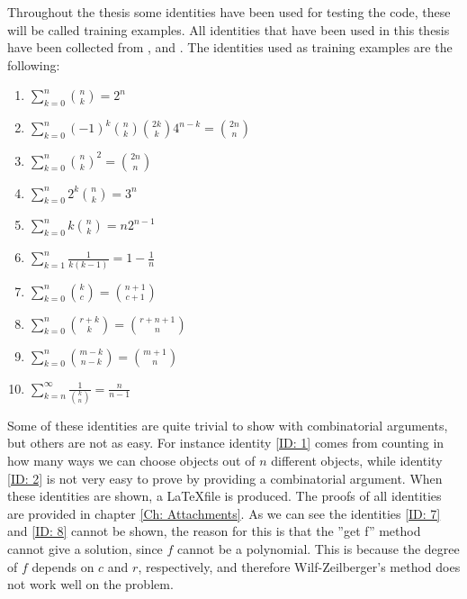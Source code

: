 Throughout the thesis some identities have been used for testing the code, these will be called training examples. All identities that have been used in this thesis have been collected from ,  and . The identities used as training examples are the following:
\begin{enumerate}
  \item $\sum_{k=0}^n \binom{n}{k} = 2^n$ \label{ID: 1}
  \item $\sum_{k=0}^n (-1)^k\binom{n}{k}\binom{2k}{k}4^{n-k}=\binom{2n}{n}$ \label{ID: 2}
  \item $\sum_{k=0}^n \binom{n}{k}^2 = \binom{2n}{n}$ \label{ID: 3}
  \item $\sum_{k=0}^n 2^k\binom{n}{k} = 3^n$ \label{ID: 4}
  \item $\sum_{k=0}^n k\binom{n}{k} = n2^{n-1}$ \label{ID: 5}
  \item $\sum_{k=1}^n \frac{1}{k(k-1)} = 1-\frac{1}{n}$ \label{ID: 6}
  \item $\sum_{k=0}^n \binom{k}{c} = \binom{n+1}{c+1}$ \label{ID: 7}
  \item $\sum_{k=0}^n \binom{r+k}{k} = \binom{r+n+1}{n}$ \label{ID: 8}
  \item $\sum_{k=0}^n \binom{m-k}{n-k} = \binom{m+1}{n}$ \label{ID: 9}
  \item $\sum_{k=n}^\infty \frac{1}{\binom{k}{n}}=\frac{n}{n-1}$ \label{ID: 10}
\end{enumerate}
Some of these identities are quite trivial to show with combinatorial arguments, but others are not as easy. For instance identity \ref{ID: 1} comes from counting in how many ways we can choose objects out of $n$ different objects, while identity \ref{ID: 2} is not very easy to prove by providing a combinatorial argument. When these identities are shown, a \LaTeX file is produced. The proofs of all identities are provided in chapter \ref{Ch: Attachments}. As we can see the identities \ref{ID: 7} and \ref{ID: 8} cannot be shown, the reason for this is that the ''get f'' method cannot give a solution, since $f$ cannot be a polynomial. This is because the degree of $f$ depends on $c$ and $r$, respectively, and therefore Wilf-Zeilberger's method does not work well on the problem.

